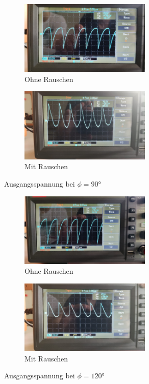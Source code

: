 \begin{figure}
    \begin{subfigure}{0.48 \textwidth}
        \centering
        \includegraphics[height = 3.5cm]{data_scripts/pics/90o.jpeg}
        \caption{Ohne Rauschen}
    \end{subfigure}
    \hfill
    \begin{subfigure}{0.48 \textwidth}
            \centering
            \includegraphics[height = 3.5cm]{data_scripts/pics/90m.jpeg}
            \caption{Mit Rauschen}
    \end{subfigure}
    \caption{Ausgangsspannung bei $\phi = \ang{90;;}$}
\end{figure}
\begin{figure}
    \begin{subfigure}{0.48 \textwidth}
        \centering
        \includegraphics[height = 3.5cm]{data_scripts/pics/120o.jpeg}
        \caption{Ohne Rauschen}
    \end{subfigure}
    \hfill
    \begin{subfigure}{0.48 \textwidth}
            \centering
            \includegraphics[height = 3.5cm]{data_scripts/pics/120m.jpeg}
            \caption{Mit Rauschen}
    \end{subfigure}
    \caption{Ausgangsspannung bei $\phi = \ang{120;;}$}
\end{figure}
